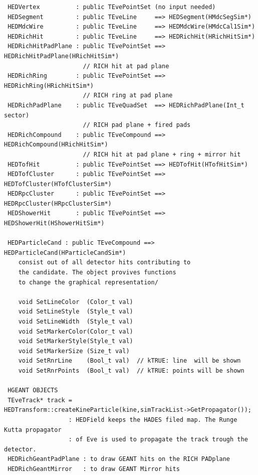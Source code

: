 \begin{lstlisting}
 HEDVertex          : public TEvePointSet (no input needed)
 HEDSegment         : public TEveLine     ==> HEDSegment(HMdcSegSim*)
 HEDMdcWire         : public TEveLine     ==> HEDMdcWire(HMdcCal1Sim*)
 HEDRichHit         : public TEveLine     ==> HEDRichHit(HRichHitSim*)
 HEDRichHitPadPlane : public TEvePointSet ==> HEDRichHitPadPlane(HRichHitSim*)
                      // RICH hit at pad plane
 HEDRichRing        : public TEvePointSet ==> HEDRichRing(HRichHitSim*)       
                      // RICH ring at pad plane
 HEDRichPadPlane    : public TEveQuadSet  ==> HEDRichPadPlane(Int_t sector)   
                      // RICH pad plane + fired pads
 HEDRichCompound    : public TEveCompound ==> HEDRichCompound(HRichHitSim*)   
                      // RICH hit at pad plane + ring + mirror hit
 HEDTofHit          : public TEvePointSet ==> HEDTofHit(HTofHitSim*)
 HEDTofCluster      : public TEvePointSet ==> HEDTofCluster(HTofClusterSim*)
 HEDRpcCluster      : public TEvePointSet ==> HEDRpcCluster(HRpcClusterSim*)
 HEDShowerHit       : public TEvePointSet ==> HEDShowerHit(HShowerHitSim*)

 HEDParticleCand : public TEveCompound ==> HEDParticleCand(HParticleCandSim*)
    consist out of all detector hits contributing to
    the candidate. The object provives functions
    to change the graphical representation/

    void SetLineColor  (Color_t val)
    void SetLineStyle  (Style_t val)
    void SetLineWidth  (Style_t val)
    void SetMarkerColor(Color_t val)
    void SetMarkerStyle(Style_t val)
    void SetMarkerSize (Size_t val)
    void SetRnrLine    (Bool_t val)  // kTRUE: line  will be shown
    void SetRnrPoints  (Bool_t val)  // kTRUE: points will be shown

 HGEANT OBJECTS
 TEveTrack* track = HEDTransform::createKineParticle(kine,simTrackList->GetPropagator());
                  : HEDField keeps the HADES filed map. The Runge Kutta propagator
                  : of Eve is used to propagate the track trough the detector.
 HEDRichGeantPadPlane : to draw GEANT hits on the RICH PADplane
 HEDRichGeantMirror   : to draw GEANT Mirror hits
\end{lstlisting}


